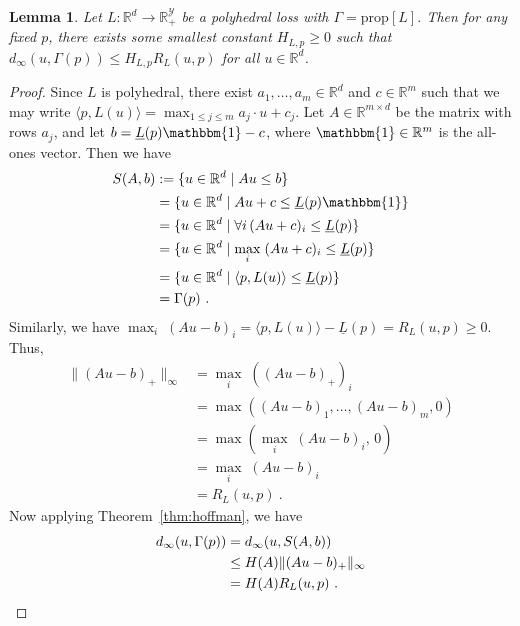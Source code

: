 \documentclass[11pt]{article}
\newcommand{\reals}{\mathbb{R}}
\newcommand{\prop}[1]{\mathrm{prop}[#1]}
\newcommand{\Y}{\mathcal{Y}}
\newcommand{\risk}[1]{\underline{#1}}
\newcommand{\inprod}[2]{\langle #1, #2 \rangle}%
\newcommand{\ones}{\mathbbm{1}}
\newcommand{\regret}[3]{R_{#1}(#2,#3)}
\newtheorem{lemma}{Lemma}
\begin{document}
\begin{lemma}\label{lem:hoffman-polyhedral}
  Let $L: \reals^d \to \reals_+^{\Y}$ be a polyhedral loss with $\Gamma = \prop{L}$.
  Then for any fixed $p$, there exists some smallest constant $H_{L,p} \geq 0$ such that $d_{\infty}(u,\Gamma(p)) \leq H_{L,p} R_L(u,p)$ for all $u \in \reals^d$.
\end{lemma}
\begin{proof}
  Since $L$ is polyhedral, there exist $a_1,\ldots,a_m \in \reals^d$ and $c\in\reals^m$ such that we may write $\inprod{p}{L(u)} = \max_{1\leq j\leq m} a_j \cdot u + c_j$.
  Let $A \in \reals^{m\times d}$ be the matrix with rows $a_j$, and let $b = \risk{L}(p)\ones - c$, where $\ones\in\reals^m$ is the all-ones vector.
  Then we have
  \begin{align*}
    S(A,b)
    &:= \{u\in\reals^d \mid A u \leq b\}
    \\
    &= \{u\in\reals^d \mid A u + c \leq \risk{L}(p)\ones\}
    \\
    &= \{u\in\reals^d \mid \forall i\, (A u + c)_i \leq \risk{L}(p)\}
    \\
    &= \{u\in\reals^d \mid \max_i \;(A u + c)_i \leq \risk{L}(p)\}
    \\
    &= \{u\in\reals^d \mid \inprod{p}{L(u)} \leq \risk{L}(p)\}
    \\
    & = \Gamma(p)~.
  \end{align*}
  Similarly, we have $\max_i\; (A u - b)_i = \inprod{p}{L(u)} - \risk{L}(p) = \regret{L}{u}{p} \geq 0$.
  Thus,
  \begin{align*}
    \|(Au - b)_+\|_\infty
    &= \max_i\; ((Au - b)_+)_i
    \\
    &= \max((Au - b)_1,\ldots,(Au - b)_m, 0)
    \\
    &= \max(\max_i\; (Au - b)_i, \, 0)
    \\
    &= \max_i\; (Au - b)_i
    \\
    &= \regret{L}{u}{p}~.
  \end{align*}
  Now applying Theorem~\ref{thm:hoffman}, we have
  \begin{align*}
    d_\infty(u,\Gamma(p))
    &=    d_\infty(u,S(A,b))
    \\
    &\leq H(A) \|(Au-b)_+\|_\infty
    \\
    &= H(A) \regret{L}{u}{p}~.\qedhere
  \end{align*}
\end{proof}
\end{document}
